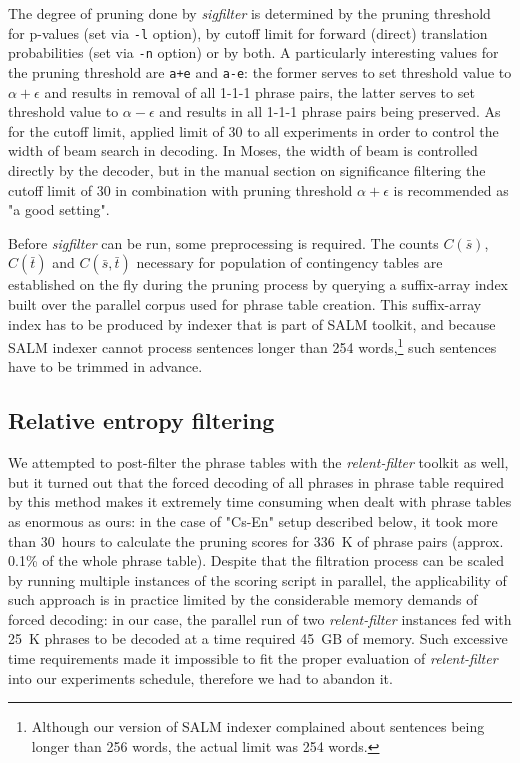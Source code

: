 The degree of pruning done by \emph{sigfilter} is determined by the pruning
threshold for p-values (set via \verb|-l| option), by cutoff limit for forward
(direct) translation probabilities (set via \verb|-n| option) or by both.
A particularly interesting values for the pruning threshold are \verb|a+e| and
\verb|a-e|: the former serves to set threshold value to $\alpha + \epsilon$ and
results in removal of all 1-1-1 phrase pairs, the latter serves to set threshold
value to $\alpha - \epsilon$ and results in all 1-1-1 phrase pairs being preserved.
As for the cutoff limit, \citet{johnson:sigfilter} applied limit of 30 to all
experiments in order to control the width of beam search in decoding.
In Moses, the width of beam is controlled directly by the decoder, but
in the manual section on significance filtering the cutoff limit of 30
in combination with pruning threshold $\alpha + \epsilon$ is recommended as
"a good setting".

Before \emph{sigfilter} can be run, some preprocessing is required.
The counts $C(\bar{s})$, $C(\bar{t})$ and $C(\bar{s},\bar{t})$ necessary for
population of contingency tables are established on the fly during the
pruning process by querying a suffix-array index built over the parallel
corpus used for phrase table creation.
This suffix-array index has to be produced by indexer that is part of SALM
toolkit,
and because SALM indexer cannot process sentences longer than 254 words,\footnote{Although
our version of SALM indexer complained about sentences being longer than 256 words,
the actual limit was 254 words.} such sentences have to be trimmed in advance.

\subsection{Relative entropy filtering}

We attempted to post-filter the phrase tables with the \emph{relent-filter} toolkit as well,
but it turned out that the forced decoding of all phrases in phrase table required by this
method makes it extremely time consuming when dealt with phrase tables as enormous as ours:
in the case of "Cs-En" setup described below, it took more than 30~hours to calculate the pruning
scores for 336~K of phrase pairs (approx. 0.1\% of the whole phrase table).
Despite that the filtration process can be scaled by running multiple
instances of the scoring script in parallel, the applicability of such approach is in practice
limited by the considerable memory demands of forced decoding: in our case, the parallel run of
two \emph{relent-filter} instances fed with 25~K phrases to be decoded at a time required
45~GB of memory.
Such excessive time requirements made it impossible to fit the proper evaluation of
\emph{relent-filter} into our experiments schedule, therefore we had to abandon it.

